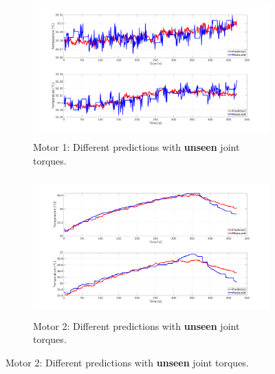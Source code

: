 \documentclass{ifacconf}
\begin{document}
\begin{figure}[t!]
	\begin{subfigure}[t]{0.5\textwidth} 
		\centering 
		\includegraphics[height=2.1in, width=\linewidth, keepaspectratio]{./pictures/applications/feedback/table/j1.png}
		\caption{Motor 1: Different predictions with \textbf{unseen} joint torques.}
	\end{subfigure}%
	\begin{subfigure}[t]{0.5\textwidth}
		\centering
		\includegraphics[height=2.1in, width=\linewidth, keepaspectratio]{./pictures/applications/feedback/table/j2_unseen.png}
		\caption{Motor 2: Different predictions with \textbf{unseen} joint torques.}
	\end{subfigure}

    \vspace{1ex} 


\end{figure}
\end{document}
